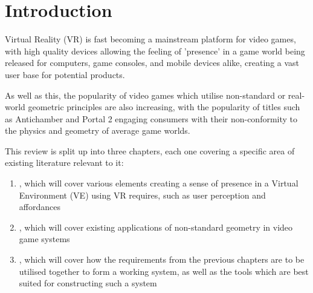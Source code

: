 \section{Introduction}
\label{lr:intro}
	
\begin{multicols*}{2}
	Virtual Reality (VR) is fast becoming a mainstream platform for video games, with high quality devices allowing the feeling of 'presence' in a game world being released for computers, game consoles, and mobile devices alike, creating a vast user base for potential products.
	
	As well as this, the popularity of video games which utilise non-standard or real-world geometric principles are also increasing, with the popularity of titles such as Antichamber \cite{Antichamber2013} and Portal 2 \cite{Portal22011} engaging consumers with their non-conformity to the physics and geometry of average game worlds.
	
	This review is split up into three chapters, each one covering a specific area of existing literature relevant to it:
	\begin{enumerate}
		\item {}, which will cover various elements creating a sense of presence in a Virtual Environment (VE) using VR requires, such as user perception and affordances
		\item {}, which will cover existing applications of non-standard geometry in video game systems
		\item {}, which will cover how the requirements from the previous chapters are to be utilised together to form a working system, as well as the tools which are best suited for constructing such a system
	\end{enumerate}
	
\end{multicols*}
